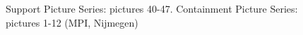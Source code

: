 \begin{figure}
\qquad
{}
\caption[SPS 40-47 and CPS 1-12]{Support Picture Series: pictures
  40-47. Containment Picture Series: pictures 1-12 (\textcopyright MPI,
Nijmegen)
\label{fig:Support-20-27-CPS-1-12}}
\end{figure}



